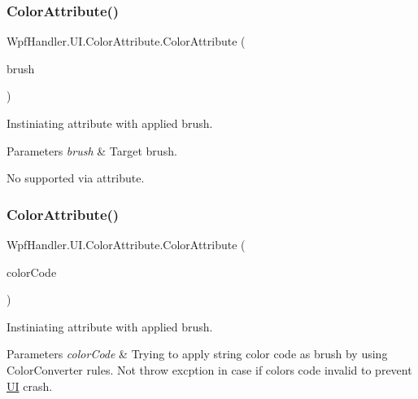\subsubsection{\texorpdfstring{Color\+Attribute()}{ColorAttribute()}\hspace{0.1cm}{\footnotesize\ttfamily [2/4]}}
{\footnotesize\ttfamily Wpf\+Handler.\+U\+I.\+Color\+Attribute.\+Color\+Attribute (\begin{DoxyParamCaption}\item[{Solid\+Color\+Brush}]{brush }\end{DoxyParamCaption})}



Instiniating attribute with applied brush. 


\begin{DoxyParams}{Parameters}
{\em brush} & Target brush.\\
\hline
\end{DoxyParams}


No supported via attribute.\mbox{\label{class_wpf_handler_1_1_u_i_1_1_color_attribute_adc45633c132e90d33ae037b138e31250}} 
\subsubsection{\texorpdfstring{Color\+Attribute()}{ColorAttribute()}\hspace{0.1cm}{\footnotesize\ttfamily [3/4]}}
{\footnotesize\ttfamily Wpf\+Handler.\+U\+I.\+Color\+Attribute.\+Color\+Attribute (\begin{DoxyParamCaption}\item[{string}]{color\+Code }\end{DoxyParamCaption})}



Instiniating attribute with applied brush. 


\begin{DoxyParams}{Parameters}
{\em color\+Code} & Trying to apply string color code as brush by using Color\+Converter rules. Not throw excption in case if color\textquotesingle{}s code invalid to prevent \mbox{\hyperlink{namespace_wpf_handler_1_1_u_i}{UI}} crash.\\
\hline
\end{DoxyParams}
\mbox{\label{class_wpf_handler_1_1_u_i_1_1_color_attribute_a4f6a8ef0ae7f5da318a1c18eafdfbc98}} 

